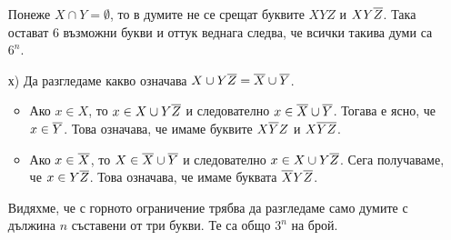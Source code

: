 \begin{solution}
\begin{enumerate}[a)]
    Понеже $X \cap Y = \emptyset$, то в думите не се срещат буквите $XYZ$ и $XY\overline{Z}$.
    Така остават $6$ възможни букви и оттук веднага следва, че всички такива думи са $6^n$.    
  \item[х)]
    Да разгледаме какво означава $X\cup Y\overline{Z} = \overline{X} \cup \overline{Y}$.
    \begin{itemize}
    \item 
      Ако $x \in X$, то $x \in X \cup Y\overline{Z}$ и следователно $x \in \overline{X} \cup \overline{Y}$.
      Тогава е ясно, че $x \in \overline{Y}$. Това означава, че имаме буквите $X\overline{Y}Z$ и $X\overline{Y}\overline{Z}$.
    \item
      Ако $x \in \overline{X}$, то $X \in \overline{X} \cup \overline{Y}$ и следователно $x \in X \cup Y\overline{Z}$.
      Сега получаваме, че $x \in Y\overline{Z}$. Това означава, че имаме буквата $\overline{X}Y\overline{Z}$.
    \end{itemize}
    Видяхме, че с горното ограничение трябва да разгледаме само думите с дължина $n$ съставени от три букви.
    Те са общо $3^n$ на брой.
  \end{enumerate}
\end{solution}





